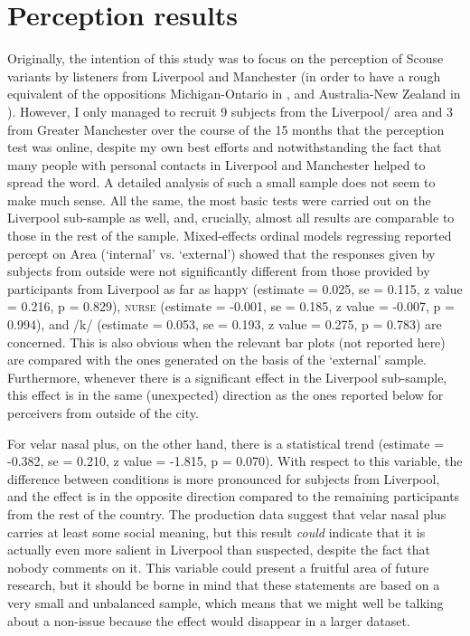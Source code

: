 \chapter{Perception results}
\label{ch.perc_res}

Originally, the intention of this study was to focus on the perception of Scouse variants by listeners from Liverpool and Manchester (in order to have a rough equivalent of the oppositions Michigan-Ontario in \citealt{niedzielski1999}, and Australia-New Zealand in \citealt{hayetal2006a}).
However, I only managed to recruit 9 subjects from the Liverpool/ area and 3 from Greater Manchester over the course of the 15 months that the perception test was online, despite my own best efforts and notwithstanding the fact that many people with personal contacts in Liverpool and Manchester helped to spread the word.
A detailed analysis of such a small sample does not seem to make much sense.
All the same, the most basic tests were carried out on the Liverpool sub-sample as well, and, crucially, almost all results are comparable to those in the rest of the sample.
Mixed-effects ordinal models regressing reported percept on Area (\enquote*{internal} vs. \enquote*{external}) showed that the responses given by subjects from outside were not significantly different from those provided by participants from Liverpool as far as happ\textsc{y} (estimate = 0.025, se = 0.115, z value = 0.216, p = 0.829), \textsc{nurse} (estimate = -0.001, se = 0.185, z value = -0.007, p = 0.994), and /k/ (estimate = 0.053, se = 0.193, z value = 0.275, p = 0.783) are concerned.
This is also obvious when the relevant bar plots (not reported here) are compared with the ones generated on the basis of the `external' sample.
Furthermore, whenever there is a significant  effect in the Liverpool sub-sample, this effect is in the same (unexpected) direction as the ones reported below for perceivers from outside of the city.

For velar nasal plus, on the other hand, there is a statistical trend (estimate = -0.382, se = 0.210, z value = -1.815, p = 0.070).
With respect to this variable, the difference between  conditions is more pronounced for subjects from Liverpool, and the effect is in the opposite direction compared to the remaining participants from the rest of the country.
The production data suggest that velar nasal plus carries at least some social meaning, but this result \emph{could} indicate that it is actually even more salient in Liverpool than suspected, despite the fact that nobody comments on it.
This variable could present a fruitful area of future research, but it should be borne in mind that these statements are based on a very small and unbalanced sample, which means that we might well be talking about a non-issue because the effect would disappear in a larger dataset.

